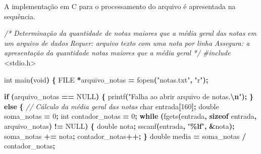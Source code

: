 \documentclass[
  11pt,
  a4paper,
]{scrbook}
\newenvironment{Shaded}{\begin{snugshade}}{\end{snugshade}}
\newcommand{\CommentTok}[1]{\textcolor[rgb]{0.56,0.35,0.01}{\textit{#1}}}
\newcommand{\ControlFlowTok}[1]{\textcolor[rgb]{0.13,0.29,0.53}{\textbf{#1}}}
\newcommand{\DataTypeTok}[1]{\textcolor[rgb]{0.13,0.29,0.53}{#1}}
\newcommand{\DecValTok}[1]{\textcolor[rgb]{0.00,0.00,0.81}{#1}}
\newcommand{\ImportTok}[1]{#1}
\newcommand{\KeywordTok}[1]{\textcolor[rgb]{0.13,0.29,0.53}{\textbf{#1}}}
\newcommand{\NormalTok}[1]{#1}
\newcommand{\OperatorTok}[1]{\textcolor[rgb]{0.81,0.36,0.00}{\textbf{#1}}}
\newcommand{\PreprocessorTok}[1]{\textcolor[rgb]{0.56,0.35,0.01}{\textit{#1}}}
\newcommand{\SpecialCharTok}[1]{\textcolor[rgb]{0.81,0.36,0.00}{\textbf{#1}}}
\newcommand{\StringTok}[1]{\textcolor[rgb]{0.31,0.60,0.02}{#1}}
\begin{document}
A implementação em C para o processamento do arquivo é apresentada na
sequência.

\begin{Shaded}
\begin{Highlighting}[]
\CommentTok{/*}
\CommentTok{Determinação da quantidade de notas maiores que a média geral das notas}
\CommentTok{    em um arquivo de dados}
\CommentTok{Requer: arquivo texto com uma nota por linha}
\CommentTok{Assegura: a apresentação da quantidade notas maiores que a média geral}
\CommentTok{*/}
\PreprocessorTok{\#include }\ImportTok{\textless{}stdio.h\textgreater{}}

\DataTypeTok{int}\NormalTok{ main}\OperatorTok{(}\DataTypeTok{void}\OperatorTok{)} \OperatorTok{\{}
    \DataTypeTok{FILE} \OperatorTok{*}\NormalTok{arquivo\_notas }\OperatorTok{=}\NormalTok{ fopen}\OperatorTok{(}\StringTok{"notas.txt"}\OperatorTok{,} \StringTok{"r"}\OperatorTok{);}

    \ControlFlowTok{if} \OperatorTok{(}\NormalTok{arquivo\_notas }\OperatorTok{==}\NormalTok{ NULL}\OperatorTok{)} \OperatorTok{\{}
\NormalTok{        printf}\OperatorTok{(}\StringTok{"Falha ao abrir arquivo de notas.}\SpecialCharTok{\textbackslash{}n}\StringTok{"}\OperatorTok{);}
    \OperatorTok{\}}
    \ControlFlowTok{else} \OperatorTok{\{}
        \CommentTok{// Cálculo da média geral das notas}
        \DataTypeTok{char}\NormalTok{ entrada}\OperatorTok{[}\DecValTok{160}\OperatorTok{];}
        \DataTypeTok{double}\NormalTok{ soma\_notas }\OperatorTok{=} \DecValTok{0}\OperatorTok{;}
        \DataTypeTok{int}\NormalTok{ contador\_notas }\OperatorTok{=} \DecValTok{0}\OperatorTok{;}
        \ControlFlowTok{while} \OperatorTok{(}\NormalTok{fgets}\OperatorTok{(}\NormalTok{entrada}\OperatorTok{,} \KeywordTok{sizeof}\NormalTok{ entrada}\OperatorTok{,}\NormalTok{ arquivo\_notas}\OperatorTok{)} \OperatorTok{!=}\NormalTok{ NULL}\OperatorTok{)} \OperatorTok{\{}
            \DataTypeTok{double}\NormalTok{ nota}\OperatorTok{;}
\NormalTok{            sscanf}\OperatorTok{(}\NormalTok{entrada}\OperatorTok{,} \StringTok{"}\SpecialCharTok{\%lf}\StringTok{"}\OperatorTok{,} \OperatorTok{\&}\NormalTok{nota}\OperatorTok{);}
\NormalTok{            soma\_notas }\OperatorTok{+=}\NormalTok{ nota}\OperatorTok{;}
\NormalTok{            contador\_notas}\OperatorTok{++;}
        \OperatorTok{\}}
        \DataTypeTok{double}\NormalTok{ media }\OperatorTok{=}\NormalTok{ soma\_notas }\OperatorTok{/}\NormalTok{ contador\_notas}\OperatorTok{;}


\end{Highlighting}
\end{Shaded}
\end{document}
